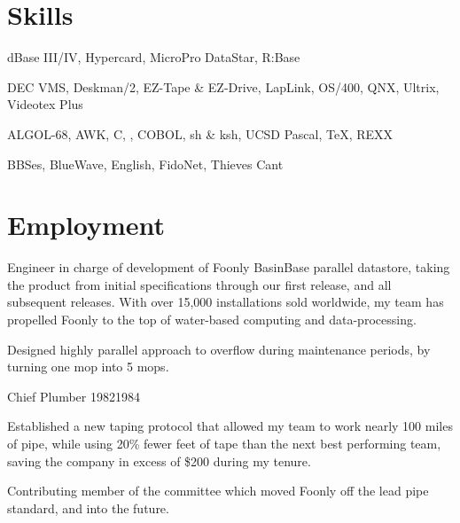 \documentclass[10pt]{article}   %
\begin{document}
    \makeintro

    \section{Skills}
    {dBase III/IV, Hypercard, MicroPro DataStar, R:Base}

    {DEC VMS, Deskman/2, EZ-Tape \& EZ-Drive, LapLink, OS/400, QNX, Ultrix, Videotex Plus} %

    {ALGOL-68, AWK, C, \CPP, COBOL, sh \& ksh, UCSD Pascal, \TeX, REXX}

    {BBSes, BlueWave, English, FidoNet, Thieves Cant}

    \section{Employment}
    \begin{description}
        \squish
        \item \vspace{-1cm}
    \end{description}

    \begin{hangingparlist}{2em}{3.5pt}{4.5pt}
        \item Engineer in charge of development of Foonly BasinBase parallel datastore, taking the product from initial specifications through our first release, and all subsequent releases.  With over 15,000 installations sold worldwide, my team has propelled Foonly to the
        top of water-based computing and data-processing.

        \item Designed highly parallel approach to overflow during maintenance periods, by turning one mop into 5 mops.
    \end{hangingparlist}

    \begin{description}
        {Chief Plumber}
        {1982}{1984}
    \end{description}

    \begin{hangingparlist}{2em}{3.5pt}{4.5pt}
        \item Established a new taping protocol that allowed my team to work nearly 100 miles of pipe, while using 20\% fewer feet of tape than the next best performing team, saving the company in excess of \$200 during my tenure.

        \item Contributing member of the committee which moved Foonly off the lead pipe standard, and into the future.
    \end{hangingparlist}
\end{document}
